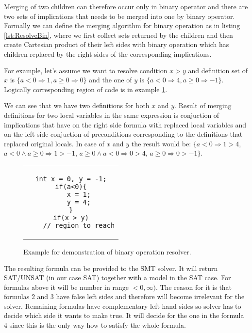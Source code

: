 \documentclass[letterpaper,12pt]{article}
\begin{document}
Merging of two children can therefore occur only in binary operator and there are two sets of implications that needs to be merged into one by binary operator. Formally we can define the merging algorithm for binary operation as in listing \ref{lst:ResolveBin}, where we first collect sets returned by the children and then create Cartesian product of their left sides with binary operation which has children replaced by the right sides of the corresponding implications.

For example, let's assume we want to resolve condition $x > y$ and definition set of $x$ is $\{a < 0 \Rightarrow 1, a \geq 0 \Rightarrow 0\}$ and the one of $y$ is $\{a < 0 \Rightarrow 4, a \geq 0 \Rightarrow -1\}$. Logically corresponding region of code is in example \ref{lst:ResolveBinEx}.

We can see that we have two definitions for both $x$ and $y$. Result of merging definitions for two local variables in the same expression is conjuction of implications that have on the right side formula with replaced local variables and on the left side conjuction of preconditions corresponding to the definitions that replaced original locals. In case of $x$ and $y$ the result would be: $\{a < 0 \Rightarrow 1 > 4$, $a < 0 \land a \geq 0 \Rightarrow 1 > -1$, $a \geq 0 \land a < 0 \Rightarrow 0 > 4$, $a \geq 0 \Rightarrow 0 > -1\}$.

\begin{figure}[thp] %
\centering 
\caption{Example for demonstration of binary operation resolver.}
\label{lst:ResolveBinEx}
\begin{tabular}{c}
\begin{lstlisting}
int x = 0, y = -1;
if(a<0){
	x = 1;
	y = 4;
}
if(x > y)
    // region to reach
\end{lstlisting}
\end{tabular}
\end{figure}

The resulting formula can be provided to the SMT solver. It will return SAT/UNSAT (in our case SAT) together with a model in the SAT case. For formulas above it will be number in range $<0, \infty)$. The reason for it is that formulas 2 and 3 have false left sides and therefore will become irrelevant for the solver. Remaining formulas have complementary left hand sides so solver has to decide which side it wants to make true. It will decide for the one in the formula 4 since this is the only way how to satisfy the whole formula.
\end{document}
